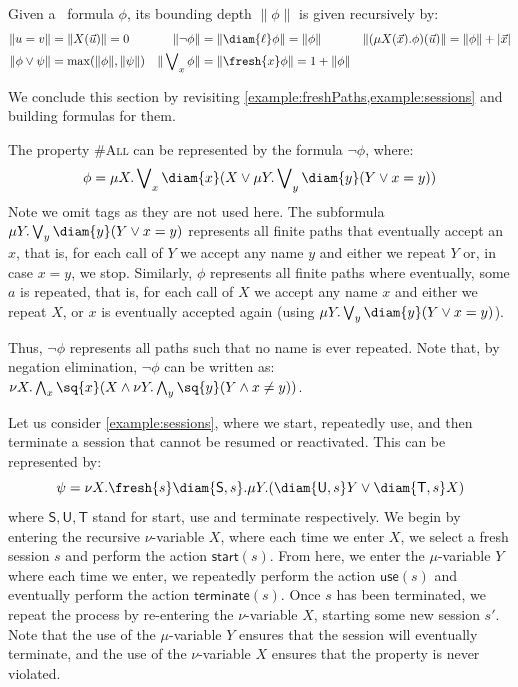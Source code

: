 \begin{definition}
	Given a \fhml\ formula $\phi$, its bounding depth $\|\phi\|$ is given recursively by:	
	\begin{align*}
		\|u = v\| &= \|X(\vec u)\| = 0  &\|\lnot \phi\| &= \|\diam{\ell}\phi\| = \|\phi\| &\|(\mu X(\vec x).\phi)(\vec u)\| = \|\phi\| + |\vec x|\\
		\|\phi \lor \psi\| &= \max(\|\phi\|, \|\psi\|) & \|\bigvee\nolimits_x \phi\| &= \|\fresh{x} \phi\| = 1 + \|\phi\|   
	\end{align*}
\end{definition}


We conclude this section by revisiting \cref{example:freshPaths,example:sessions} and building formulas for them.

\begin{example} The property \textsc{\#All}
 can be represented by the formula $\lnot \phi$, where:
\[
	\phi = \mu X.\bigvee\nolimits_x\diam{x}(X\lor\mu Y.\bigvee\nolimits_y \diam{y}(Y\lor x=y))
\]
Note we omit tags as they are not used here.
The subformula $\mu Y.\bigvee\nolimits_y \diam{y}(Y\lor x=y)$ represents all finite paths that eventually accept an $x$, that is, for each call of $Y$ we accept any name $y$ and either  we repeat $Y$ or, in case $x = y$, we stop. 
Similarly, $\phi$ represents all finite paths where eventually, some $a$ is repeated, that is, for each call of $X$ we accept any name $x$ and either we 
repeat $X$, or $x$ is eventually accepted again (using $\mu Y.\bigvee\nolimits_y \diam{y}(Y\lor x=y)$).

Thus, $\lnot \phi$ represents all paths such that no name is ever repeated.
Note that, by negation elimination, $\lnot \phi$ can be written as:
$
\nu X.\bigwedge\nolimits_x\sq{x}( X\land \nu Y.\bigwedge\nolimits_y \sq{y}(Y\land x\neq y))
$.
\end{example}

\begin{example}
Let us consider \cref{example:sessions}, where we start, repeatedly use, and then terminate a session that cannot be resumed or reactivated. 
This can be represented by:
\[
	\psi = \nu X. \fresh{s}\diam{\mathsf{S}, s}.\mu Y.(\diam{\mathsf{U}, s}Y \lor \diam{\mathsf{T}, s}X)
\]
where $\mathsf{S,U,T}$ stand for start, use and terminate respectively.
We begin by entering the recursive $\nu$-variable $X$, where each time we enter $X$, we select a fresh session $s$ and perform the action $\mathsf{start}(s)$. 
From here, we enter the $\mu$-variable $Y$ where each time we enter, we repeatedly perform the action $\mathsf{use}(s)$ and eventually perform the action $\mathsf{terminate}(s)$. 
Once $s$ has been terminated, we repeat the process by re-entering the $\nu$-variable $X$, starting some new session $s'$. 
Note that the use of the $\mu$-variable $Y$ ensures that the session will eventually terminate, and the use of the $\nu$-variable $X$ ensures that the property is never violated.
\end{example}


